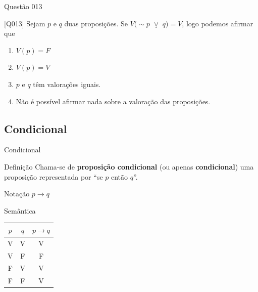 \documentclass[xcolor=dvipsnames,table]{beamer}
\begin{document}
\begin{frame}{Questão 013}
\begin{block}{[Q013]}
	Sejam $p$ e $q$ duas proposições. Se $V(\sim p$ $\underline{\vee}$ $q) = V$, logo podemos afirmar que
\end{block}
\begin{enumerate}[label=(\Alph*)]
	\item $V(p) = F$
	\item $V(p) = V$
	\item $p$ e $q$ têm valorações iguais.
	\item Não é possível afirmar nada sobre a valoração das proposições.
\end{enumerate}
\end{frame}

\subsection{Condicional}
\begin{frame}{Condicional}
\begin{block}{Definição}
	Chama-se de {\bf proposição condicional} (ou apenas {\bf condicional}) uma proposição representada por ``se $p$ então $q$''.
\end{block} \pause
\begin{block}{Notação}
	$p \rightarrow q$
\end{block} \pause
\begin{block}{Semântica}
	\begin{center}
		\begin{tabular}{|cc|c|}
			\hline
			$p$	&	$q$	&	$p \rightarrow q$	\\
			\hline
			V	&	V	&	V	\\
			V	&	F	&	F	\\
			F	&	V	&	V	\\
			F	&	F	&	V	\\
			\hline
		\end{tabular}
	\end{center}
\end{block}
\end{frame}
\end{document}
